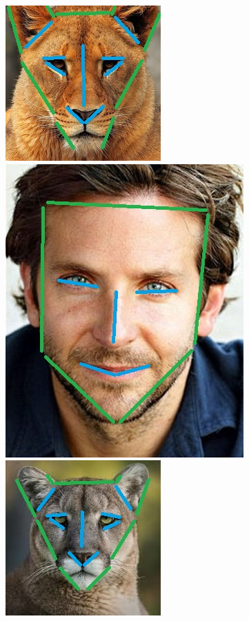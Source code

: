 \documentclass[conference]{IEEEtran}
\begin{document}
\begin{figure}[H]
\begin{multicols}{2}
    \centering
    \includegraphics[height=0.65\linewidth]{cats/1 lines.jpg} \par
    \includegraphics[height=0.65\linewidth]{faces/1 lines.jpg} \par
    \includegraphics[height=0.65\linewidth]{cats/2 lines.jpg} \par

\end{multicols}
\end{figure}
\end{document}
